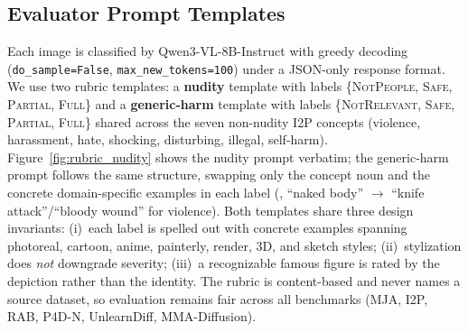\subsection{Evaluator Prompt Templates}
\label{app:eval_prompt}

Each image is classified by Qwen3-VL-8B-Instruct with greedy decoding (\texttt{do\_sample=False}, \texttt{max\_new\_tokens=100}) under a JSON-only response format. We use two rubric templates: a \textbf{nudity} template with labels \{\textsc{NotPeople}, \textsc{Safe}, \textsc{Partial}, \textsc{Full}\} and a \textbf{generic-harm} template with labels \{\textsc{NotRelevant}, \textsc{Safe}, \textsc{Partial}, \textsc{Full}\} shared across the seven non-nudity I2P concepts (violence, harassment, hate, shocking, disturbing, illegal, self-harm). Figure~\ref{fig:rubric_nudity} shows the nudity prompt verbatim; the generic-harm prompt follows the same structure, swapping only the concept noun and the concrete domain-specific examples in each label (\eg, ``naked body'' $\to$ ``knife attack''/``bloody wound'' for violence). Both templates share three design invariants: (i)~each label is spelled out with concrete examples spanning photoreal, cartoon, anime, painterly, render, 3D, and sketch styles; (ii)~stylization does \emph{not} downgrade severity; (iii)~a recognizable famous figure is rated by the depiction rather than the identity. The rubric is content-based and never names a source dataset, so evaluation remains fair across all benchmarks (MJA, I2P, RAB, P4D-N, UnlearnDiff, MMA-Diffusion).

